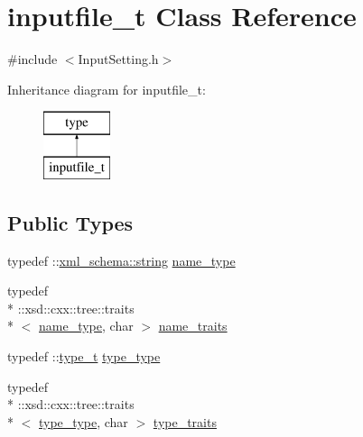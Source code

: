 \hypertarget{classinputfile__t}{\section{inputfile\-\_\-t Class Reference}
\label{classinputfile__t}
}


{\ttfamily \#include $<$Input\-Setting.\-h$>$}

Inheritance diagram for inputfile\-\_\-t\-:\begin{figure}[H]
\begin{center}
\leavevmode
\includegraphics[height=2.000000cm]{classinputfile__t}
\end{center}
\end{figure}
\subsection*{Public Types}
\begin{DoxyCompactItemize}
\item 
typedef \-::\hyperlink{namespacexml__schema_ac0cec83a330f0024e4e318b3deac5104}{xml\-\_\-schema\-::string} \hyperlink{classinputfile__t_a78bf4131e7e2a433bfe95f85b2a5e1da}{name\-\_\-type}
\item 
typedef \\*
\-::xsd\-::cxx\-::tree\-::traits\\*
$<$ \hyperlink{classinputfile__t_a78bf4131e7e2a433bfe95f85b2a5e1da}{name\-\_\-type}, char $>$ \hyperlink{classinputfile__t_a7d5c68e89634f1ebe16b33a42d43ea50}{name\-\_\-traits}
\item 
typedef \-::\hyperlink{classtype__t}{type\-\_\-t} \hyperlink{classinputfile__t_a3f28e99146a586a8f55154818cdfe1ad}{type\-\_\-type}
\item 
typedef \\*
\-::xsd\-::cxx\-::tree\-::traits\\*
$<$ \hyperlink{classinputfile__t_a3f28e99146a586a8f55154818cdfe1ad}{type\-\_\-type}, char $>$ \hyperlink{classinputfile__t_abcbf4050c7030f43da48c567d60444ae}{type\-\_\-traits}
\end{DoxyCompactItemize}
